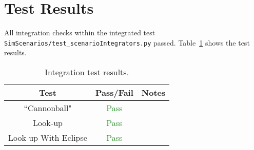 \section{Test Results}
All integration checks within the integrated test {\tt SimScenarios/test\_scenarioIntegrators.py} passed.  Table~\ref{tbl:intResults} shows the test results.


\begin{table}[H]
	\caption{Integration test results.}
	\label{tbl:intResults}
	\centering \fontsize{10}{10}\selectfont
	\begin{tabular}{c | c | c  } %
		\hline\hline
		\textbf{Test} 			& \textbf{Pass/Fail} 	 & \textbf{Notes} 									        
		\\ \hline
		``Cannonball"		  	&\textcolor{ForestGreen}{Pass}      	  &	        \\ \hline
		Look-up	   	           	&\textcolor{ForestGreen}{Pass}              		&           		\\ \hline
		Look-up With Eclipse      	&\textcolor{ForestGreen}{Pass}   &\\ 
		\hline\hline
	\end{tabular}
\end{table}